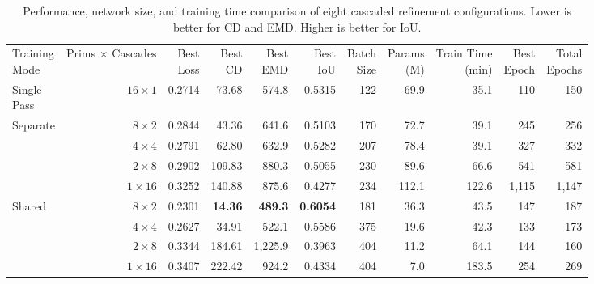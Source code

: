 \begin{table}[!htb]
	\centering
	\singlespace
	\footnotesize
	\setlength{\tabcolsep}{3pt}
	\setcellgapes{4pt}
	\makegapedcells
	\renewcommand{\bfdefault}{b}
	\begin{tabular}{|l|r|r|r|r|r|r|r|r|r|r|}
		\hline
		\makecell{Training\\Mode} & \makecell{Prims $\times$\\Cascades} & \makecell{Best\\Loss} & \makecell{Best\\CD} & \makecell{Best\\EMD} & \makecell{Best\\IoU} & \makecell{Batch\\Size} & \makecell{Params\\(M)} & \makecell{Train Time\\(min)} & \makecell{Best\\Epoch} & \makecell{Total\\Epochs} \\
		\Xhline{1pt}
		\makecell[l]{Single\\Pass} & $16 \times 1$ & 0.2714 & 73.68          & 574.8          & 0.5315          & 122 & 69.9  & 35.1  & 110  & 150  \\
		\hline
		\multirow{4}{*}{Separate} & $8 \times 2$  & 0.2844 & 43.36          & 641.6          & 0.5103          & 170 & 72.7  & 39.1  & 245  & 256  \\
		                          & $4 \times 4$  & 0.2791 & 62.80          & 632.9          & 0.5282          & 207 & 78.4  & 39.1  & 327  & 332  \\
		                          & $2 \times 8$  & 0.2902 & 109.83         & 880.3          & 0.5055          & 230 & 89.6  & 66.6  & 541  & 581  \\
		                          & $1 \times 16$ & 0.3252 & 140.88         & 875.6          & 0.4277          & 234 & 112.1 & 122.6 & 1,115 & 1,147 \\
		\hline
		\multirow{4}{*}{Shared}   & $8 \times 2$  & 0.2301 & \textbf{14.36} & \textbf{489.3} & \textbf{0.6054} & 181 & 36.3  & 43.5  & 147  & 187  \\
		                          & $4 \times 4$  & 0.2627 & 34.91          & 522.1          & 0.5586          & 375 & 19.6  & 42.3  & 133  & 173  \\
		                          & $2 \times 8$  & 0.3344 & 184.61         & 1,225.9         & 0.3963          & 404 & 11.2  & 64.1  & 144  & 160  \\
		                          & $1 \times 16$ & 0.3407 & 222.42         & 924.2          & 0.4334          & 404 & 7.0   & 183.5 & 254  & 269  \\
		\hline
	\end{tabular}
	\caption{Performance, network size, and training time comparison of eight cascaded refinement configurations. Lower is better for CD and EMD. Higher is better for IoU.}
	\label{tab:prims_per_cascade_comparison}
\end{table}


